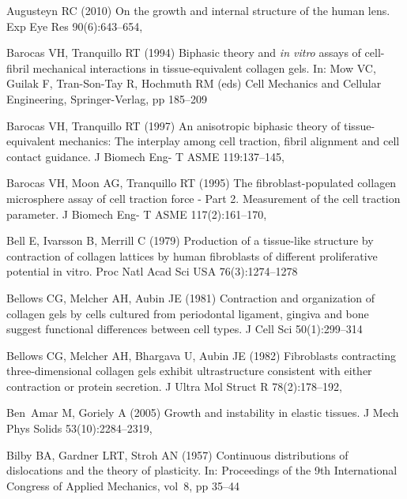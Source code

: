 \begin{thebibliography}{124}
Augusteyn RC (2010) On the growth and internal structure of the human lens. Exp
  Eye Res 90(6):643--654, 

Barocas VH, Tranquillo RT (1994) Biphasic theory and \emph{in vitro} assays of
  cell-fibril mechanical interactions in tissue-equivalent collagen gels. In:
  Mow VC, Guilak F, Tran-Son-Tay R, Hochmuth RM (eds) Cell Mechanics and
  Cellular Engineering, Springer-Verlag, pp 185--209

Barocas VH, Tranquillo RT (1997) An anisotropic biphasic theory of
  tissue-equivalent mechanics: The interplay among cell traction, fibril
  alignment and cell contact guidance. J Biomech Eng- T ASME 119:137--145,

Barocas VH, Moon AG, Tranquillo RT (1995) The fibroblast-populated collagen
  microsphere assay of cell traction force - {P}art 2. {M}easurement of the
  cell traction parameter. J Biomech Eng- T ASME 117(2):161--170,

Bell E, Ivarsson B, Merrill C (1979) Production of a tissue-like structure by
  contraction of collagen lattices by human fibroblasts of different
  proliferative potential in vitro. Proc Natl Acad Sci USA 76(3):1274--1278

Bellows CG, Melcher AH, Aubin JE (1981) Contraction and organization of
  collagen gels by cells cultured from periodontal ligament, gingiva and bone
  suggest functional differences between cell types. J Cell Sci 50(1):299--314

Bellows CG, Melcher AH, Bhargava U, Aubin JE (1982) Fibroblasts contracting
  three-dimensional collagen gels exhibit ultrastructure consistent with either
  contraction or protein secretion. J Ultra Mol Struct R 78(2):178--192,

Ben~Amar M, Goriely A (2005) Growth and instability in elastic tissues. J Mech
  Phys Solids 53(10):2284--2319, 

Bilby BA, Gardner LRT, Stroh AN (1957) Continuous distributions of dislocations
  and the theory of plasticity. In: Proceedings of the 9th International
  Congress of Applied Mechanics, vol~8, pp 35--44


\end{thebibliography}
